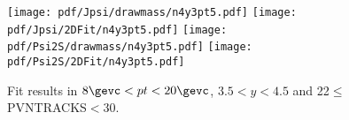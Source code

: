 \begin{figure}[H]
\begin{center}
\texttt{[image: pdf/Jpsi/drawmass/n4y3pt5.pdf]}
\texttt{[image: pdf/Jpsi/2DFit/n4y3pt5.pdf]}
\vspace*{-0.5cm}
\texttt{[image: pdf/Psi2S/drawmass/n4y3pt5.pdf]}
\texttt{[image: pdf/Psi2S/2DFit/n4y3pt5.pdf]}
\vspace*{-0.5cm}
\end{center}
\caption{Fit results in $8\gevc<pt<20\gevc$, $3.5<y<4.5$ and 22$\leq$PVNTRACKS$<$30.}
\label{Fitn4y3pt5}
\end{figure}
